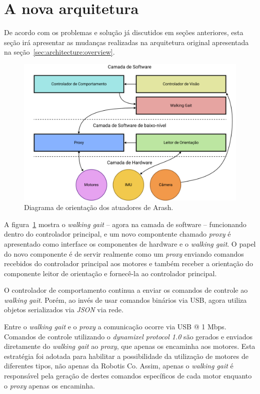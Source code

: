 \section{A nova arquitetura}

De acordo com os problemas e solução já discutidos em seções anteriores, esta seção irá apresentar as mudanças realizadas na arquitetura original apresentada na seção~\ref{sec:architecture:overview}.

\begin{figure}[h!]
	\centering
	\includegraphics[scale=1]{imagens/svg/softwarearchitecture-newproposal}
	\caption{Diagrama de orientação dos atuadores de Arash.}
	\label{fig:softwarearchitecture:newproposal}
\end{figure}

A figura~\ref{fig:softwarearchitecture:newproposal} mostra o \textit{walking gait} -- agora na camada de software -- funcionando dentro do controlador principal, e um novo compontente chamado \textit{proxy} é apresentado como interface os componentes de hardware e o \textit{walking gait}. O papel do novo componente é de servir realmente como um \textit{proxy} enviando comandos recebidos do controlador principal aos motores e também receber a orientação do componente leitor de orientação e fornecê-la ao controlador principal.

O controlador de comportamento continua a enviar os comandos de controle ao \textit{walking gait}. Porém, ao invés de usar comandos binários via USB, agora utiliza objetos serializados via \textit{JSON} via rede. 

Entre o \textit{walking gait} e o \textit{proxy} a comunicação ocorre via USB @ 1 Mbps. Comandos de controle utilizando o \textit{dynamixel protocol 1.0} são gerados e enviados diretamente do \textit{walking gait} ao \textit{proxy}, que apenas os encaminha aos motores. Esta estratégia foi adotada para habilitar a possibilidade da utilização de motores de diferentes tipos, não apenas da Robotis Co. Assim, apenas o \textit{walking gait} é responsável pela geração de destes comandos específicos de cada motor enquanto o \textit{proxy} apenas os encaminha.


